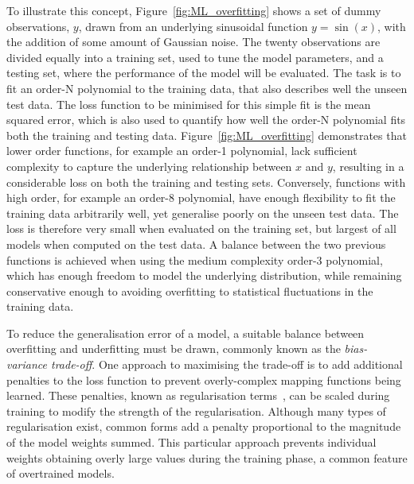 To illustrate this concept, Figure~\ref{fig:ML_overfitting} shows a set of dummy observations, $y$, drawn from an underlying sinusoidal function $y=\sin({x})$, with the addition of some amount of Gaussian noise. The twenty observations are divided equally into a training set, used to tune the model parameters, and a testing set, where the performance of the model will be evaluated. The task is to fit an order-N polynomial to the training data, that also describes well the unseen test data. The loss function to be minimised for this simple fit is the mean squared error, which is also used to quantify how well the order-N polynomial fits both the training and testing data. Figure~\ref{fig:ML_overfitting} demonstrates that lower order functions, for example an order-1 polynomial, lack sufficient complexity to capture the underlying relationship between $x$ and $y$, resulting in a considerable loss on both the training and testing sets. Conversely, functions with high order, for example an order-8 polynomial, have enough flexibility to fit the training data arbitrarily well, yet generalise poorly on the unseen test data. The loss is therefore very small when evaluated on the training set, but largest of all models when computed on the test data. A balance between the two previous functions is achieved when using the medium complexity order-3 polynomial, which has enough freedom to model the underlying distribution, while remaining conservative enough to avoiding overfitting to statistical fluctuations in the training data.

To reduce the generalisation error of a model, a suitable balance between overfitting and underfitting must be drawn, commonly known as the \textit{bias-variance trade-off}. One approach to maximising the trade-off is to add additional penalties to the loss function to prevent overly-complex mapping functions being learned. These penalties, known as regularisation terms~\cite{deep_learning}, can be scaled during training to modify the strength of the regularisation. Although many types of regularisation exist, common forms add a penalty proportional to the magnitude of the model weights summed. This particular approach prevents individual weights obtaining overly large values during the training phase, a common feature of overtrained models.

